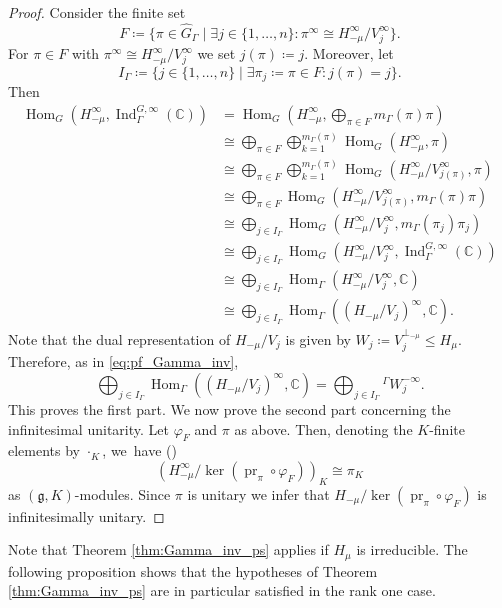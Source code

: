 \documentclass[JEP,XML,SOM,NoFloatCountersInSection,Unicode,published]{cedram}
\newcommand{\Ga}{{}^\Gamma\!}
\theoremstyle{definition}
\newcommand{\mf}[1]{\ensuremath{\mathfrak{#1}}}
\newcommand{\on}[1]{\ensuremath{\operatorname{#1}}}
\newcommand{\Hom}[3]{\ensuremath{\on{Hom}_{#1}(#2,#3)}}
\newcommand{\C}{\ensuremath{\mathbb{C}}}
\newcommand{\ps}[2]{\ensuremath{H_{#2}}}
\newcommand{\pss}[2]{\ensuremath{H_{#2}^\infty}}
\begin{document}
\begin{proof}
Consider the finite set
\[
F\coloneqq\{\pi\in\hat G_{\Gamma}\mid\exists j\in\{1,\ldots,n\}\colon \pi^\infty\cong\pss{\tilde\sigma}{-\mu}/V_j^\infty\}.
\]
For $\pi\in F$ with $\pi^\infty\cong\pss{\tilde\sigma}{-\mu}/V_j^\infty$ we set $j(\pi)\coloneqq j$. Moreover, let
\[
I_\Gamma\coloneqq\{j\in\{1,\ldots,n\}\mid\exists \pi_j\coloneqq\pi\in F\colon j(\pi)=j\}.
\]
Then
\begin{align*}
\Hom{G}{\pss{\tilde\sigma}{-\mu}}{\on{Ind}_\Gamma^{G,\infty}(\C)}&=\Hom{G}{\pss{\tilde\sigma}{-\mu}}{\bigoplus_{\pi\in F}m_{\Gamma}(\pi)\pi}\\[-5pt]
&\cong\bigoplus_{\pi\in F}\bigoplus_{k=1}^{m_{\Gamma}(\pi)}\Hom{G}{\pss{\tilde\sigma}{-\mu}}{\pi}\\
&\cong\bigoplus_{\pi\in F}\bigoplus_{k=1}^{m_{\Gamma}(\pi)}\Hom{G}{\pss{\tilde\sigma}{-\mu}/V_{j(\pi)}^\infty}{\pi}\\
&\cong\bigoplus_{\pi\in F}\Hom{G}{\pss{\tilde\sigma}{-\mu}/V_{j(\pi)}^\infty}{m_{\Gamma}(\pi)\pi}\\
&\cong\bigoplus_{j\in I_\Gamma}\Hom{G}{\pss{\tilde\sigma}{-\mu}/V_{j}^\infty}{m_{\Gamma}(\pi_j)\pi_j}\\
&\cong\bigoplus_{j\in I_\Gamma}\Hom{G}{\pss{\tilde\sigma}{-\mu}/V_{j}^\infty}{\on{Ind}_\Gamma^{G,\infty}(\C)}\\
&\cong\bigoplus_{j\in I_\Gamma}\Hom{\Gamma}{\pss{\tilde\sigma}{-\mu}/V_{j}^\infty}{\C}\\
&\cong\bigoplus_{j\in I_\Gamma}\Hom{\Gamma}{(\ps{\tilde\sigma}{-\mu}/V_{j})^\infty}{\C}.
\end{align*}
Note that the dual representation of $\ps{\tilde\sigma}{-\mu}/V_j$ is given by $W_j\coloneqq V_j^{\perp_{-\mu}}\leq\ps{\sigma}{\mu}$. Therefore, as in \eqref{eq:pf_Gamma_inv},
\[
\bigoplus_{j\in I_\Gamma}\Hom{\Gamma}{(\ps{\tilde\sigma}{-\mu}/V_{j})^\infty}{\C}=\bigoplus_{j\in I_\Gamma}{}\Ga W_j^{-\infty}.
\]
This proves the first part. We now prove the second part concerning the infinitesimal unitarity. Let $\varphi_F$ and $\pi$ as above. Then, denoting the $K$-finite elements by $\cdot_K$, we~have (\cf \cite[Cor.\,11.6.8]{W92})
\[
\left(\pss{\tilde\sigma}{-\mu}/\ker(\on{pr}_\pi\circ\varphi_F)\right)_K\cong\pi_K
\]
as $(\mf g,K)$-modules. Since $\pi$ is unitary we infer that $\ps{\tilde\sigma}{-\mu}/\ker(\on{pr}_\pi\circ \varphi_F)$ is infinitesimally unitary.
\end{proof}

Note that Theorem \ref{thm:Gamma_inv_ps} applies if $\ps{\sigma}{\mu}$ is irreducible. The following proposition shows that the hypotheses of Theorem \ref{thm:Gamma_inv_ps} are in particular satisfied in the rank one case.
\end{document}
